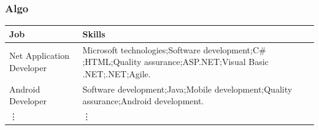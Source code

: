 \documentclass[10pt,mathserif]{beamer}
\begin{document}
	\begin{frame}
	\frametitle{Algo}

\begin{center}
	\begin{tabular}{ | p{2.5cm} |p{4.5cm} |}
		\hline
		Job & Skills \\ \hline
		Net Application Developer& Microsoft technologies;Software development;C$\#$;HTML;Quality assurance;ASP.NET;Visual Basic .NET;.NET;Agile.\\\hline
		Android Developer	& Software development;Java;Mobile development;Quality assurance;Android development.\\\hline
		\vdots	&	\vdots\\ \hline
	\end{tabular}
\end{center}
	
\end{frame}
\end{document}
